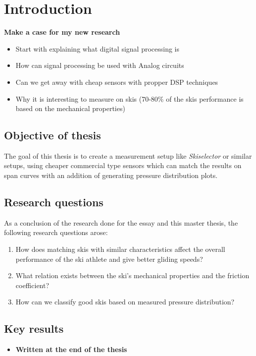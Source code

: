 \chapter{Introduction}
\textbf{Make a case for my new research}
\begin{itemize}
    \item Start with explaining what digital signal processing is
    \item How can signal processing be used with Analog circuits
    \item Can we get away with cheap sensors with propper DSP techniques
    \item Why it is interesting to measure on skis (70-80\% of the skis performance is based on the mechanical properties)
\end{itemize}

\section{Objective of thesis}
The goal of this thesis is to create a measurement setup like \textit{Skiselector} or similar setups, using cheaper commercial type sensors which can match the results on span curves with an addition of generating pressure distribution plots.

\section{Research questions}
\label{sec:researchquestions}
As a conclusion of the research done for the essay and this master thesis, the following research questions arose:

\begin{enumerate}[label=\textbf{\Alph*}]
    \item How does matching skis with similar characteristics affect the overall performance of the ski athlete and give better gliding speeds?
    \item What relation exists between the ski's mechanical properties and the friction coefficient?
    \item How can we classify good skis based on measured pressure distribution?
\end{enumerate}

\section{Key results}
\begin{itemize}
    \item \textbf{Written at the end of the thesis}
\end{itemize}

